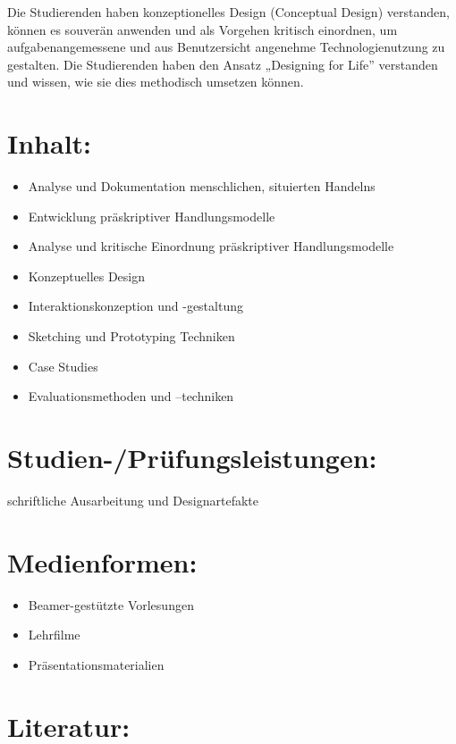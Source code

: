 Die Studierenden haben konzeptionelles Design (Conceptual Design)
verstanden, können es souverän anwenden und als Vorgehen kritisch
einordnen, um aufgabenangemessene und aus Benutzersicht angenehme
Technologienutzung zu gestalten. Die Studierenden haben den Ansatz
„Designing for Life'' verstanden und wissen, wie sie dies methodisch
umsetzen können.

\section*{Inhalt:}\label{inhalt-11}

\begin{itemize}
\item
  Analyse und Dokumentation menschlichen, situierten Handelns
\item
  Entwicklung präskriptiver Handlungsmodelle
\item
  Analyse und kritische Einordnung präskriptiver Handlungsmodelle
\item
  Konzeptuelles Design
\item
  Interaktionskonzeption und -gestaltung
\item
  Sketching und Prototyping Techniken
\item
  Case Studies
\item
  Evaluationsmethoden und --techniken
\end{itemize}

\section*{Studien-/Prüfungsleistungen:}\label{studien-pruxfcfungsleistungen-11}

schriftliche Ausarbeitung und Designartefakte

\section*{Medienformen:}\label{medienformen-11}

\begin{itemize}
\item
  Beamer-gestützte Vorlesungen
\item
  Lehrfilme
\item
  Präsentationsmaterialien
\end{itemize}

\section*{Literatur:}\label{literatur-11}


